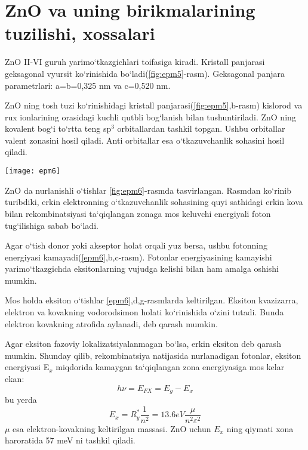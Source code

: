 \documentclass[14pt]{article}
\begin{document}
	 
	\section{ZnO va uning birikmalarining tuzilishi, xossalari}
	ZnO II-VI guruh yarimo`tkazgichlari toifasiga kiradi. Kristall panjarasi geksagonal vyursit ko`rinishida bo`ladi(\ref{fig:epm5}-rasm). Geksagonal panjara parametrlari: a=b=0,325 nm va c=0,520 nm. 
	
	ZnO ning tosh tuzi ko`rinishidagi kristall panjarasi(\ref{fig:epm5},b-rasm) kislorod va rux ionlarining orasidagi kuchli qutbli bog`lanish bilan tushuntiriladi. ZnO ning kovalent bog`i to`rtta teng sp$^{3}$ orbitallardan tashkil topgan. Ushbu orbitallar valent zonasini hosil qiladi. Anti orbitallar esa o`tkazuvchanlik sohasini hosil qiladi. 
	
	
\begin{figure*}[h]
	\centering
	\texttt{[image: epm6]}
	\caption{ZnO da nurlanishli o`tishlar}
	\label{fig:epm6}
\end{figure*}
	
	ZnO da nurlanishli o`tishlar \ref{fig:epm6}-rasmda tasvirlangan. 
	Rasmdan ko`rinib turibdiki, erkin elektronning o`tkazuvchanlik sohasining quyi sathidagi erkin kova bilan rekombinatsiyasi ta`qiqlangan zonaga mos keluvchi energiyali foton tug`ilishiga sabab bo`ladi. 
	
	Agar o`tish donor yoki akseptor holat orqali yuz  bersa, ushbu fotonning energiyasi kamayadi(\ref{epm6},b,c-rasm). Fotonlar energiyasining kamayishi yarimo`tkazgichda eksitonlarning vujudga kelishi bilan ham amalga oshishi mumkin. 
	
	Mos holda eksiton o`tishlar \ref{epm6},d,g-rasmlarda keltirilgan. Eksiton kvazizarra, elektron va kovakning vodorodsimon holati ko`rinishida o`zini tutadi. Bunda elektron kovakning atrofida aylanadi, deb qarash mumkin. 
	
	Agar eksiton fazoviy lokalizatsiyalanmagan bo`lsa, erkin eksiton deb qarash mumkin. Shunday qilib, rekombinatsiya natijasida nurlanadigan fotonlar, eksiton energiyasi E$_{x}$ miqdorida kamaygan ta`qiqlangan zona energiyasiga mos kelar ekan:
	\begin{equation}
	h\nu=E_{FX}=E_{g}-E_{x}
	\end{equation}
	bu yerda 
	\begin{equation}
	E_{x}=R_{y}^{*}\frac{1}{n^{2}}=13.6 eV\frac{\mu}{n^{2}\varepsilon^{2}}
	\end{equation}
	$\mu$ esa elektron-kovakning keltirilgan massasi. ZnO uchun $E_{x}$ ning qiymati xona haroratida 57 meV ni tashkil qiladi. 
\end{document}
